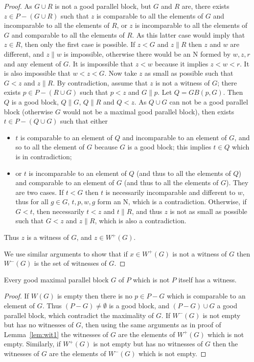 \documentclass{CSML}
\begin{document}
\begin{proof}
  As $G\cup R$ is not a good parallel block, but $G$ and $R$ are, there exists $z\in P-(G\cup R)$ such that $z$ is comparable to all the elements of $G$ and incomparable to all the elements of $R$, or $z$ is incomparable to all the elements of $G$ and comparable to all the elements of $R$. As this latter case would imply that $z\in R$, then only the first case is possible. If $z<G$ and $z\parallel R$ then $z$ and $w$ are different, and $z\parallel w$ is impossible, otherwise there would be an N formed by $w,z,r$ and any element of $G$. It is impossible that $z<w$ because it implies $z<w<r$. It is also impossible that $w<z<G$. Now take $z$ as small as possible such that $G<z$ and $z\parallel R$. By contradiction, assume that $z$ is not a witness of $G$; there exists $p\in P-(R\cup G)$ such that $p<z$ and $G\parallel p$. Let $Q=GB(p,G)$. Then $Q$ is a good block, $Q\parallel G$, $Q\parallel R$ and $Q<z$. As $Q\cup G$ can not be a good parallel block (otherwise $G$ would not be a maximal good parallel block), then exists $t\in P-(Q\cup G)$ such that either
\begin{itemize}
\item $t$ is comparable to an element of $Q$ and incomparable to an element of $G$, and so to all the element of $G$ because $G$ is a good block; this implies $t\in Q$ which is in contradiction;
\item or $t$ is incomparable to an element of $Q$ (and thus to all the elements of $Q$) and comparable to an element of $G$ (and thus to all the elements of $G$). They are two cases. If $t<G$ then $t$ is necessarily incomparable and different to $w$, thus for all $g\in G$, $t,p,w,g$ form an N, which is a contradiction. Otherwise, if $G<t$, then necessarily $t<z$ and $t\parallel R$, and thus $z$ is not as small as possible such that $G<z$ and $z\parallel R$, which is also a contradiction.
\end{itemize}
Thus $z$ is a witness of $G$, and $z\in W^+(G)$.

We use similar arguments to show that if $x\in W^+(G)$ is not a witness of $G$ then $W^-(G)$ is the set of witnesses of $G$.
\end{proof}

\begin{cor}
  Every good maximal parallel block $G$ of $P$ which is not $P$ itself has a witness.
\end{cor}

\begin{proof}
  If $W(G)$ is empty then there is no $p\in P-G$ which is comparable to an element of $G$. Thus $(P-G)\not=\emptyset$ is a good block, and $(P-G)\cup G$ a good parallel block, which contradict the maximality of $G$.
  If $W^-(G)$ is not empty but has no witnesses of $G$, then using the same arguments as in proof of Lemma~\ref{lem:wit1} the witnesses of $G$ are the elements of $W^+(G)$ which is not empty. Similarly, if $W^+(G)$ is not empty but has no witnesses of $G$ then the witnesses of $G$ are the elements of $W^-(G)$ which is not empty.
\end{proof}
\end{document}
